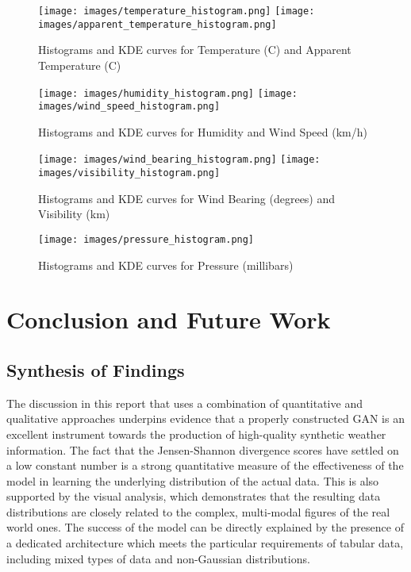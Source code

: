 \documentclass[12pt, draftclsnofoot, onecolumn]{IEEEtran}
\begin{document}
\begin{figure}[H]
    \centering
    \texttt{[image: images/temperature\_histogram.png]}
    \texttt{[image: images/apparent\_temperature\_histogram.png]}
    \caption{Histograms and KDE curves for Temperature (C) and Apparent Temperature (C)}
\end{figure}

\begin{figure}[H]
    \centering
    \texttt{[image: images/humidity\_histogram.png]}
    \texttt{[image: images/wind\_speed\_histogram.png]}
    \caption{Histograms and KDE curves for Humidity and Wind Speed (km/h)}
\end{figure}

\begin{figure}[H]
    \centering
    \texttt{[image: images/wind\_bearing\_histogram.png]}
    \texttt{[image: images/visibility\_histogram.png]}
    \caption{Histograms and KDE curves for Wind Bearing (degrees) and Visibility (km)}
\end{figure}

\begin{figure}[H]
    \centering
    \texttt{[image: images/pressure\_histogram.png]}
    \caption{Histograms and KDE curves for Pressure (millibars) }
\end{figure}



\section{Conclusion and Future Work}

\subsection{Synthesis of Findings}
The discussion in this report that uses a combination of quantitative and qualitative approaches underpins evidence that a properly constructed GAN is an excellent instrument towards the production of high-quality synthetic weather information. The fact that the Jensen-Shannon divergence scores have settled on a low constant number is a strong quantitative measure of the effectiveness of the model in learning the underlying distribution of the actual data. This is also supported by the visual analysis, which demonstrates that the resulting data distributions are closely related to the complex, multi-modal figures of the real world ones. The success of the model can be directly explained by the presence of a dedicated architecture which meets the particular requirements of tabular data, including mixed types of data and non-Gaussian distributions.  
\end{document}
